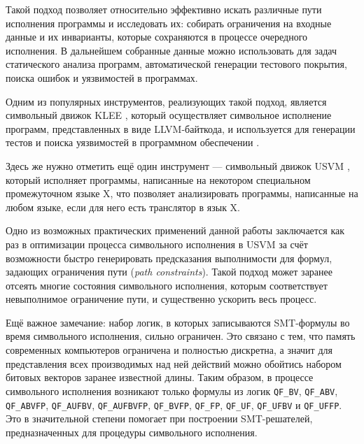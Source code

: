 Такой подход позволяет относительно эффективно искать различные пути исполнения программы и исследовать их: собирать ограничения на входные данные и их инварианты, которые сохраняются в процессе очередного исполнения. В дальнейшем собранные данные можно использовать для задач статического анализа программ, автоматической генерации тестового покрытия, поиска ошибок и уязвимостей в программах.

Одним из популярных инструментов, реализующих такой подход, является символьный движок KLEE \cite{klee-website}, который осуществляет символьное исполнение программ, представленных в виде LLVM-байткода, и используется для генерации тестов и поиска уязвимостей в программном обеспечении \cite{klee-paper}.

Здесь же нужно отметить ещё один инструмент --- символьный движок USVM \cite{usvm-diploma}, который исполняет программы, написанные на некотором специальном промежуточном языке X, что позволяет анализировать программы, написанные на любом языке, если для него есть транслятор в язык X.

Одно из возможных практических применений данной работы заключается как раз в оптимизации процесса символьного исполнения в USVM за счёт возможности быстро генерировать предсказания выполнимости для формул, задающих ограничения пути (\textit{path constraints}). Такой подход может заранее отсеять многие состояния символьного исполнения, которым соответствует невыполнимое ограничение пути, и существенно ускорить весь процесс.

Ещё важное замечание: набор логик, в которых записываются SMT-формулы во время символьного исполнения, сильно ограничен. Это связано с тем, что память современных компьютеров ограничена и полностью дискретна, а значит для представления всех производимых над ней действий можно обойтись набором битовых векторов заранее известной длины. Таким образом, в процессе символьного исполнения возникают только формулы из логик \texttt{QF\_BV}, \texttt{QF\_ABV}, \texttt{QF\_ABVFP}, \texttt{QF\_AUFBV}, \texttt{QF\_AUFBVFP}, \texttt{QF\_BVFP}, \texttt{QF\_FP}, \texttt{QF\_UF}, \texttt{QF\_UFBV} и \texttt{QF\_UFFP}. Это в значительной степени помогает при построении SMT-решателей, предназначенных для процедуры символьного исполнения.
